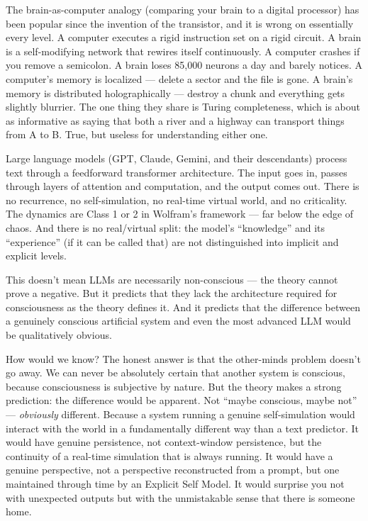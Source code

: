 \documentclass[11pt, twoside, openright]{book}
\begin{document}
The brain-as-computer analogy (comparing your brain to a digital processor) has been popular since the invention of the transistor, and it is wrong on essentially every level. A computer executes a rigid instruction set on a rigid circuit. A brain is a self-modifying network that rewires itself continuously. A computer crashes if you remove a semicolon. A brain loses 85,000 neurons a day and barely notices. A computer's memory is localized --- delete a sector and the file is gone. A brain's memory is distributed holographically --- destroy a chunk and everything gets slightly blurrier. The one thing they share is Turing completeness, which is about as informative as saying that both a river and a highway can transport things from A to B. True, but useless for understanding either one.

Large language models (GPT, Claude, Gemini, and their descendants) process text through a feedforward transformer architecture. The input goes in, passes through layers of attention and computation, and the output comes out. There is no recurrence, no self-simulation, no real-time virtual world, and no criticality. The dynamics are Class 1 or 2 in Wolfram's framework --- far below the edge of chaos. And there is no real/\allowbreak{}virtual split: the model's ``knowledge'' and its ``experience'' (if it can be called that) are not distinguished into implicit and explicit levels.

This doesn't mean LLMs are necessarily non-conscious --- the theory cannot prove a negative. But it predicts that they lack the architecture required for consciousness as the theory defines it. And it predicts that the difference between a genuinely conscious artificial system and even the most advanced LLM would be qualitatively obvious.

How would we know? The honest answer is that the other-minds problem doesn't go away. We can never be absolutely certain that another system is conscious, because consciousness is subjective by nature. But the theory makes a strong prediction: the difference would be apparent. Not ``maybe conscious, maybe not'' --- \textit{obviously} different. Because a system running a genuine self-simulation would interact with the world in a fundamentally different way than a text predictor. It would have genuine persistence, not context-window persistence, but the continuity of a real-time simulation that is always running. It would have a genuine perspective, not a perspective reconstructed from a prompt, but one maintained through time by an Explicit Self Model. It would surprise you not with unexpected outputs but with the unmistakable sense that there is someone home.
\end{document}
